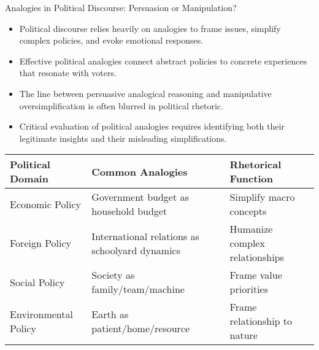 \documentclass{beamer}
\begin{document}
\begin{frame}{Analogies in Political Discourse: Persuasion or Manipulation?}
	\begin{itemize}
		\item Political discourse relies heavily on analogies to frame issues, simplify complex policies, and evoke emotional responses.
		\item Effective political analogies connect abstract policies to concrete experiences that resonate with voters.
		\item The line between persuasive analogical reasoning and manipulative oversimplification is often blurred in political rhetoric.
		\item Critical evaluation of political analogies requires identifying both their legitimate insights and their misleading simplifications.
	\end{itemize}
	
	\begin{table}
		\scriptsize
		\begin{tabular}{|p{2.5cm}|p{4cm}|p{4cm}|}
			\hline
			\textbf{Political Domain} & \textbf{Common Analogies} & \textbf{Rhetorical Function} \\
			\hline
			Economic Policy & Government budget as household budget & Simplify macro concepts \\
			\hline
			Foreign Policy & International relations as schoolyard dynamics & Humanize complex relationships \\
			\hline
			Social Policy & Society as family/team/machine & Frame value priorities \\
			\hline
			Environmental Policy & Earth as patient/home/resource & Frame relationship to nature \\
			\hline
		\end{tabular}
	\end{table}
\end{frame}
\end{document}
